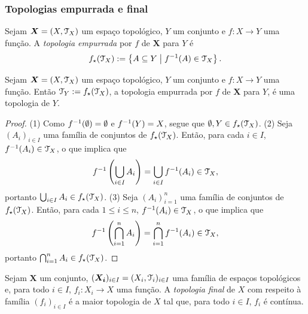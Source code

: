 \subsubsection{Topologias empurrada e final}

\begin{definition}
Sejam $\bm X = (X,\mathcal{T}_X)$ um espaço topológico, $Y$ um conjunto e $f: X \to Y$ uma função. A \emph{topologia empurrada} por $f$ de $\bm X$ para $Y$ é
	\begin{equation*}
	f_\star(\mathcal{T}_X) := \left\{{A \subseteq Y}\;\middle\vert\;{f^{-1}(A) \in \mathcal{T}_X}\right\}.
	\end{equation*}
\end{definition}

\begin{proposition}
Sejam $\bm X = (X,\mathcal{T}_X)$ um espaço topológico, $Y$ um conjunto e $f: X \to Y$ uma função. Então $\mathcal{T}_Y := f_\star(\mathcal{T}_X)$, a topologia empurrada por $f$ de $\bm X$ para $Y$, é uma topologia de $Y$.
\end{proposition}
\begin{proof}
(1) Como $f^{-1}(\emptyset)=\emptyset$ e $f^{-1}(Y)=X$, segue que $\emptyset,Y \in f_\star(\mathcal{T}_X)$. (2) Seja $(A_i)_{i \in I}$ uma família de conjuntos de $f_\star(\mathcal{T}_X)$. Então, para cada $i \in I$, $f^{-1}(A_i) \in \mathcal{T}_X$, o que implica que
\begin{equation*}
	f^{-1} \left( \bigcup_{i \in I} A_i \right) = \bigcup_{i \in I} f^{-1}(A_i) \in \mathcal{T}_X,
	\end{equation*}
portanto $\bigcup_{i \in I} A_i \in f_\star(\mathcal{T}_X)$. (3) Seja $(A_i)_{i=1}^n$ uma família de conjuntos de $f_\star(\mathcal{T}_X)$. Então, para cada $1 \leq i \leq n$, $f^{-1}(A_i) \in \mathcal{T}_X$, o que implica que
\begin{equation*}
	f^{-1} \left( \bigcap_{i=1}^n A_i \right) = \bigcap_{i=1}^n f^{-1}(A_i) \in \mathcal{T}_X,
	\end{equation*}
portanto $\bigcap_{i=1}^n A_i \in f_\star(\mathcal{T}_X)$.
\end{proof}

\begin{definition}
Sejam $\bm X$ um conjunto, $(\bm{X_i})_{i \in I} = (X_i,\mathcal{T}_i)_{i \in I}$ uma família de espaços topológicos e, para todo $i \in I$, $f_i: X_i \to X$ uma função. A \emph{topologia final} de $X$ com respeito à família $(f_i)_{i \in I}$ é a maior topologia de $X$ tal que, para todo $i \in I$, $f_i$ é contínua.
\end{definition}

